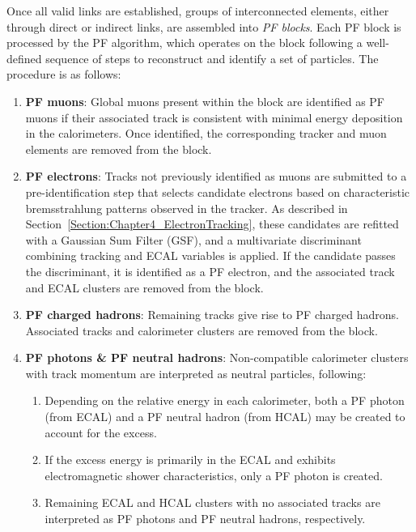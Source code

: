 Once all valid links are established, groups of interconnected elements, either through direct or indirect links, are assembled into \textit{PF blocks}. Each PF block is processed by the PF algorithm, which operates on the block following a well-defined sequence of steps to reconstruct and identify a set of particles. The procedure is as follows:

\begin{enumerate}
    \item \textbf{PF muons}: Global muons present within the block are identified as PF muons if their associated track is consistent with minimal energy deposition in the calorimeters. Once identified, the corresponding tracker and muon elements are removed from the block.
    \item \textbf{PF electrons}: Tracks not previously identified as muons are submitted to a pre-identification step that selects candidate electrons based on characteristic bremsstrahlung patterns observed in the tracker. As described in Section~\ref{Section:Chapter4_ElectronTracking}, these candidates are refitted with a Gaussian Sum Filter (GSF), and a multivariate discriminant combining tracking and \ac{ECAL} variables is applied. If the candidate passes the discriminant, it is identified as a PF electron, and the associated track and \ac{ECAL} clusters are removed from the block.
    \item \textbf{PF charged hadrons}: Remaining tracks give rise to PF charged hadrons. Associated tracks and calorimeter clusters are removed from the block.
    \item \textbf{PF photons \& PF neutral hadrons}: Non-compatible calorimeter clusters with track momentum are interpreted as neutral particles, following:
    \begin{enumerate}
        \item Depending on the relative energy in each calorimeter, both a PF photon (from \ac{ECAL}) and a PF neutral hadron (from \ac{HCAL}) may be created to account for the excess.
        \item If the excess energy is primarily in the \ac{ECAL} and exhibits electromagnetic shower characteristics, only a PF photon is created.
        \item Remaining \ac{ECAL} and \ac{HCAL} clusters with no associated tracks are interpreted as PF photons and PF neutral hadrons, respectively.
    \end{enumerate}
\end{enumerate}

